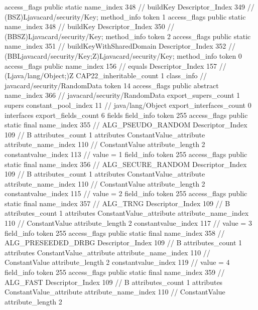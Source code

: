 {{{{{					access_flags	public static
					name_index	348		// buildKey
					Descriptor_Index	349		// (BSZ)Ljavacard/security/Key;
				}
				method_info {
					token	1
					access_flags	public static
					name_index	348		// buildKey
					Descriptor_Index	350		// (BBSZ)Ljavacard/security/Key;
				}
				method_info {
					token	2
					access_flags	public static
					name_index	351		// buildKeyWithSharedDomain
					Descriptor_Index	352		// (BBLjavacard/security/Key;Z)Ljavacard/security/Key;
				}
				method_info {
					token	0
					access_flags	public
					name_index	156		// equals
					Descriptor_Index	157		// (Ljava/lang/Object;)Z
				}
			}
			CAP22_inheritable_count	1
		}
		class_info {		// javacard/security/RandomData
			token	14
			access_flags	public abstract
			name_index	366		// javacard/security/RandomData
			export_supers_count	1
			supers {
				constant_pool_index	11		// java/lang/Object
			}
			export_interfaces_count	0
			interfaces {
			}
			export_fields_count	6
			fields {
			field_info {
				token	255
				access_flags	public static final
				name_index	355		// ALG_PSEUDO_RANDOM
				Descriptor_Index	109		// B
				attributes_count	1
				attributes {
				ConstantValue_attribute {
					attribute_name_index	110		// ConstantValue
					attribute_length	2
					constantvalue_index	113		// value = 1
				}
				}
			}
			field_info {
				token	255
				access_flags	public static final
				name_index	356		// ALG_SECURE_RANDOM
				Descriptor_Index	109		// B
				attributes_count	1
				attributes {
				ConstantValue_attribute {
					attribute_name_index	110		// ConstantValue
					attribute_length	2
					constantvalue_index	115		// value = 2
				}
				}
			}
			field_info {
				token	255
				access_flags	public static final
				name_index	357		// ALG_TRNG
				Descriptor_Index	109		// B
				attributes_count	1
				attributes {
				ConstantValue_attribute {
					attribute_name_index	110		// ConstantValue
					attribute_length	2
					constantvalue_index	117		// value = 3
				}
				}
			}
			field_info {
				token	255
				access_flags	public static final
				name_index	358		// ALG_PRESEEDED_DRBG
				Descriptor_Index	109		// B
				attributes_count	1
				attributes {
				ConstantValue_attribute {
					attribute_name_index	110		// ConstantValue
					attribute_length	2
					constantvalue_index	119		// value = 4
				}
				}
			}
			field_info {
				token	255
				access_flags	public static final
				name_index	359		// ALG_FAST
				Descriptor_Index	109		// B
				attributes_count	1
				attributes {
				ConstantValue_attribute {
					attribute_name_index	110		// ConstantValue
					attribute_length	2
}}}}}}}
